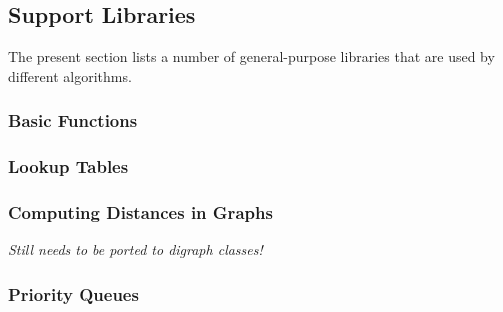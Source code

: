 



\subsection{Support Libraries}

\label{section-gd-libs}

The present section lists a number of general-purpose libraries that
are used by different algorithms.

\subsubsection{Basic Functions}



\subsubsection{Lookup Tables}


\subsubsection{Computing Distances in Graphs}

\emph{Still needs to be ported to digraph classes!}


\subsubsection{Priority Queues}




